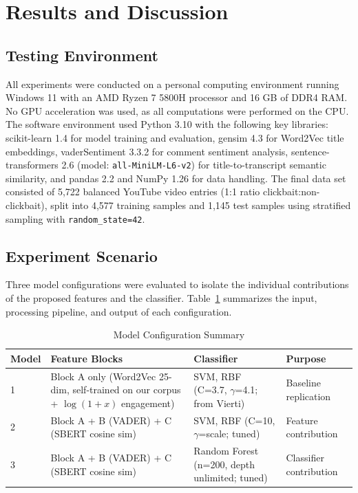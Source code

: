 \documentclass[conference]{IEEEtran}
\begin{document}
\section{Results and Discussion}

\subsection{Testing Environment}
All experiments were conducted on a personal computing environment running Windows 11 with an AMD Ryzen 7 5800H processor and 16 GB of DDR4 RAM. No GPU acceleration was used, as all computations were performed on the CPU. The software environment used Python 3.10 with the following key libraries: scikit-learn 1.4 for model training and evaluation, gensim 4.3 for Word2Vec title embeddings, vaderSentiment 3.3.2 for comment sentiment analysis, sentence-transformers 2.6 (model: \texttt{all-MiniLM-L6-v2}) for title-to-transcript semantic similarity, and pandas 2.2 and NumPy 1.26 for data handling. The final data set consisted of 5,722 balanced YouTube video entries (1:1 ratio clickbait:non-clickbait), split into 4,577 training samples and 1,145 test samples using stratified sampling with \texttt{random\_state=42}.

\subsection{Experiment Scenario}
Three model configurations were evaluated to isolate the individual
contributions of the proposed features and the classifier. Table~\ref{tab:model_configs}
summarizes the input, processing pipeline, and output of each configuration.

\begin{table}[htbp]
\caption{Model Configuration Summary}
\label{tab:model_configs}
\centering
\begin{tabular}{|p{1cm}|p{2.5cm}|p{2.0cm}|p{1.5cm}|}
\hline
\textbf{Model} & \textbf{Feature Blocks} & \textbf{Classifier} & \textbf{Purpose} \\
\hline
1 & Block A only (Word2Vec 25-dim, self-trained on our corpus + $\log(1+x)$ engagement) & SVM, RBF (C=3.7, $\gamma$=4.1; from Vierti) & Baseline replication \\
\hline
2 & Block A + B (VADER) + C (SBERT cosine sim) & SVM, RBF (C=10, $\gamma$=scale; tuned) & Feature contribution \\
\hline
3 & Block A + B (VADER) + C (SBERT cosine sim) & Random Forest (n=200, depth unlimited; tuned) & Classifier contribution \\
\hline
\end{tabular}
\end{table}
\end{document}
